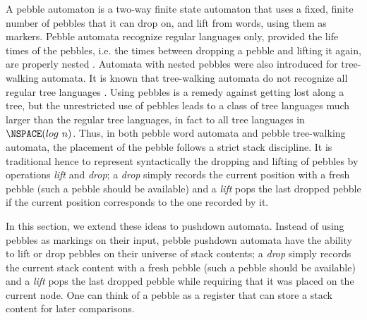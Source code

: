 \documentclass[a4paper,UKenglish,cleveref, autoref, thm-restate]{lipics-v2021}
\begin{document}
%
%
% 
%
%
A pebble automaton is a two-way finite state automaton that uses a fixed, finite number of
pebbles that it can drop on, and lift from 
words, using them as markers.
Pebble automata recognize regular languages only, provided the life times of the pebbles, i.e. the times between dropping a pebble and lifting it again, are properly nested
\cite{globerman1996complexity, engelfriet1999tree}.
Automata with nested pebbles were also introduced
for tree-walking automata. 
It is known that tree-walking automata do not recognize all regular tree languages \cite{bojanczyk2008tree}%
.
Using pebbles is a remedy against getting lost along a tree, but 
the unrestricted use of pebbles leads to a class of tree languages much larger than the
regular tree languages, in fact to all tree languages in $\NSPACE(log ~ n)$.
Thus, in  both pebble word automata and pebble tree-walking automata, the placement of the pebble follows a strict stack discipline. It is traditional hence to represent syntactically the dropping and lifting of pebbles by operations \textit{lift} and \textit{drop}; a \textit{drop} simply records the current position with a fresh pebble (such a pebble should be available) %
and a \textit{lift} pops the last dropped pebble if the current position corresponds to the one recorded by it.




In this section, we extend these ideas to pushdown automata. Instead of using pebbles as markings on their input, pebble pushdown automata have the ability to lift or drop pebbles on their universe of stack contents; a \textit{drop} simply records the current stack content with a fresh pebble (such a pebble should be available) %
and a \textit{lift} pops the last dropped pebble 
while requiring that
 it was placed on the current node. 
One can think of a pebble as a register that can store a stack content for later comparisons.
\end{document}

